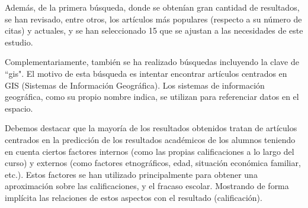 Además, de la primera búsqueda, donde se obtenían gran cantidad de resultados, se han revisado, entre otros, los artículos más populares (respecto a su número de citas) y actuales, y se han seleccionado 15 que se ajustan a las necesidades de este estudio.

Complementariamente, también se ha realizado búsquedas incluyendo la clave de ``gis". El motivo de esta búsqueda es intentar encontrar artículos centrados en GIS (Sistemas de Información Geográfica). Los sistemas de información geográfica, como su propio nombre indica, se utilizan para referenciar datos en el espacio. 



Debemos destacar que la mayoría de los resultados obtenidos tratan de artículos centrados en la predicción de los resultados académicos de los alumnos teniendo en cuenta ciertos factores internos (como las propias calificaciones a lo largo del curso) y externos (como factores etnográficos, edad, situación económica familiar, etc.). Estos factores se han utilizado principalmente para obtener una aproximación sobre las calificaciones, y el fracaso escolar. Mostrando de forma implícita las relaciones de estos aspectos con el resultado (calificación).





